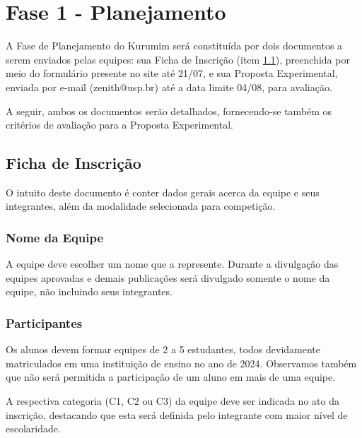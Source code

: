 \section{Fase 1 - Planejamento}\label{sec:planejamento}
    \par A Fase de Planejamento do Kurumim será constituída por dois documentos a serem 
    enviados pelas equipes: sua Ficha de Inscrição (item \ref{sec:ficha_inscricao}), preenchida por meio do formulário 
    presente no site até 21/07, e sua Proposta Experimental, enviada por e-mail (zenith@usp.br) 
    até a data limite 04/08, para avaliação.

    A seguir, ambos os documentos serão detalhados, fornecendo-se também os critérios de avaliação para a Proposta Experimental.

    \subsection{Ficha de Inscrição}\label{sec:ficha_inscricao}
        O intuito deste documento é conter dados gerais acerca da equipe e seus integrantes, além da modalidade selecionada para competição.
    
        \subsubsection{Nome da Equipe}
            A equipe deve escolher um nome que a represente. Durante a divulgação das equipes aprovadas e demais publicações será divulgado somente o nome da equipe, não incluindo seus integrantes.
            
        \subsubsection{Participantes}
            Os alunos devem formar equipes de 2 a 5 estudantes, todos devidamente matriculados em uma instituição de ensino no ano de 2024. Observamos também que não será permitida a participação de um aluno em mais de uma equipe.

            A respectiva categoria (C1, C2 ou C3) da equipe deve ser indicada no ato da inscrição, destacando que esta será definida pelo integrante com maior nível de escolaridade. 
                
    
